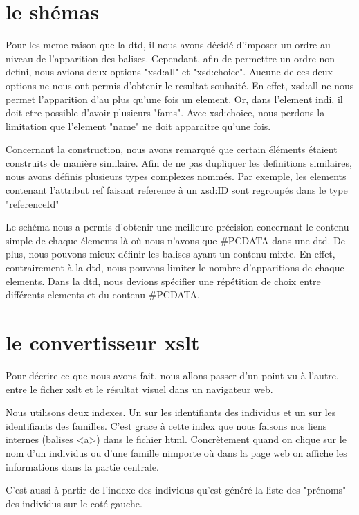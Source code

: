 \documentclass[12pt,a4paper]{report}
\begin{document}
\chapter{le shémas}

Pour les meme raison que la dtd, il nous avons décidé d'imposer un ordre au niveau de l'apparition
des balises. Cependant, afin de permettre un ordre non defini, nous avions deux options
"xsd:all" et "xsd:choice". Aucune de ces deux options ne nous ont permis d'obtenir le resultat
souhaité. En effet, xsd:all ne nous permet l'apparition d'au plus qu'une 
fois un element. Or, dans l'element indi, il doit etre possible d'avoir
plusieurs "fams". Avec xsd:choice, nous perdons la limitation que l'element
"name" ne doit apparaitre qu'une fois.

Concernant la construction, nous avons remarqué que certain éléments étaient
construits de manière similaire. Afin de ne pas dupliquer les definitions 
similaires, nous avons définis plusieurs types complexes nommés.
Par exemple, les elements contenant l'attribut ref faisant reference à un 
xsd:ID sont regroupés dans le type "referenceId"

Le schéma nous a permis d'obtenir une meilleure précision concernant le 
contenu simple de chaque élements là où nous n'avons que \#PCDATA dans 
une dtd. De plus, nous pouvons mieux définir les balises ayant un contenu mixte.
En effet, contrairement à la dtd, nous pouvons limiter le nombre d'apparitions 
de chaque elements. Dans la dtd, nous devions spécifier une répétition de choix 
entre différents elements et du contenu \#PCDATA. 





\chapter{le convertisseur xslt}

Pour décrire ce que nous avons fait, nous allons passer d'un point vu à
l'autre, entre le ficher xslt et le résultat visuel dans un navigateur web.

Nous utilisons deux indexes. Un sur les identifiants des individus et un sur
les identifiants des familles. C'est grace à cette index que nous faisons nos
liens internes (balises <a>) dans le fichier html. Concrètement quand on clique
sur le nom d'un individus ou d'une famille nimporte où dans la page web on
affiche les informations dans la partie centrale.

C'est aussi à partir de l'indexe des individus qu'est généré la liste des
"prénoms" des individus sur le coté gauche.
\end{document}
